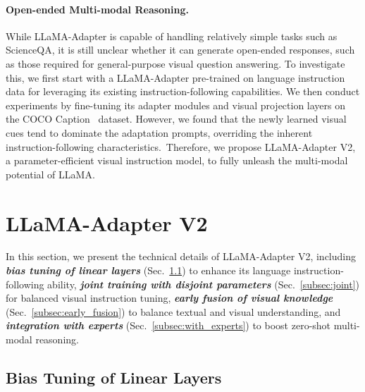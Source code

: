 \documentclass[10pt,twocolumn,letterpaper]{article}
\begin{document}
\paragraph{Open-ended Multi-modal Reasoning.}
While LLaMA-Adapter is capable of handling relatively simple tasks such as ScienceQA, it is still unclear whether it can generate open-ended responses, such as those required for general-purpose visual question answering.
To investigate this, we first start with a LLaMA-Adapter pre-trained on language instruction data for leveraging its existing instruction-following capabilities. 
We then conduct experiments by fine-tuning its adapter modules and visual projection layers on the COCO Caption~\cite{chen2015microsoft} dataset. 
However, we found that the newly learned visual cues tend to dominate the adaptation prompts, overriding the inherent instruction-following characteristics.~Therefore, we propose LLaMA-Adapter V2, a parameter-efficient visual instruction model, to fully unleash the multi-modal potential of LLaMA.


\section{LLaMA-Adapter V2}
\label{sec:llama_adapter_v2}

In this section, we present the technical details of LLaMA-Adapter V2, including \textit{\textbf{bias tuning of linear layers}} (Sec.~\ref{subsec:bias_tuning}) to enhance its language instruction-following ability, \textit{\textbf{joint training with disjoint parameters}} (Sec.~\ref{subsec:joint}) for balanced visual instruction tuning, \textit{\textbf{early fusion of visual knowledge}} (Sec.~\ref{subsec:early_fusion}) to balance textual and visual understanding, and \textit{\textbf{integration with experts}} (Sec.~\ref{subsec:with_experts}) to boost zero-shot multi-modal reasoning.

\subsection{Bias Tuning of Linear Layers}
\label{subsec:bias_tuning}
\end{document}
